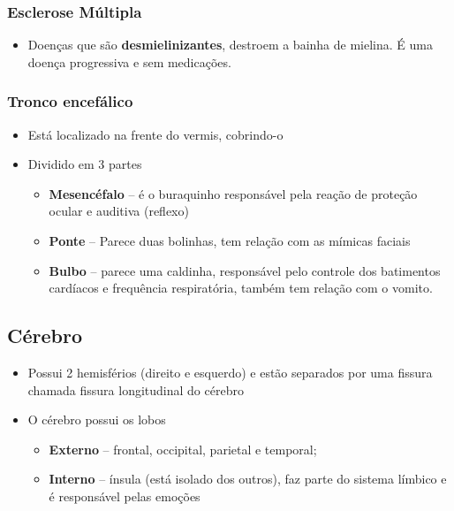 \documentclass[
]{book}
\providecommand{\tightlist}{%
  \setlength{\itemsep}{0pt}\setlength{\parskip}{0pt}}
\begin{document}
\hypertarget{esclerose-muxfaltipla}{%
\subsubsection{Esclerose Múltipla}\label{esclerose-muxfaltipla}}

\begin{itemize}
\tightlist
\item
  Doenças que são \textbf{desmielinizantes}, destroem a bainha de mielina. É uma doença progressiva e sem medicações.
\end{itemize}

\hypertarget{tronco-encefuxe1lico}{%
\subsubsection{Tronco encefálico}\label{tronco-encefuxe1lico}}

\begin{itemize}
\tightlist
\item
  Está localizado na frente do vermis, cobrindo-o
\item
  Dividido em 3 partes

  \begin{itemize}
  \tightlist
  \item
    \textbf{Mesencéfalo} -- é o buraquinho responsável pela reação de proteção ocular e auditiva
    (reflexo)
  \item
    \textbf{Ponte} -- Parece duas bolinhas, tem relação com as mímicas faciais
  \item
    \textbf{Bulbo} -- parece uma caldinha, responsável pelo controle dos batimentos cardíacos e frequência respiratória, também tem relação com o vomito.
  \end{itemize}
\end{itemize}

\hypertarget{cuxe9rebro}{%
\subsection{Cérebro}\label{cuxe9rebro}}

\begin{itemize}
\tightlist
\item
  Possui 2 hemisférios (direito e esquerdo) e estão separados por uma fissura chamada fissura longitudinal do cérebro
\item
  O cérebro possui os lobos

  \begin{itemize}
  \tightlist
  \item
    \textbf{Externo} -- frontal, occipital, parietal e temporal;
  \item
    \textbf{Interno} -- ínsula (está isolado dos outros), faz parte do sistema límbico e é responsável pelas emoções
  \end{itemize}
\end{itemize}
\end{document}
